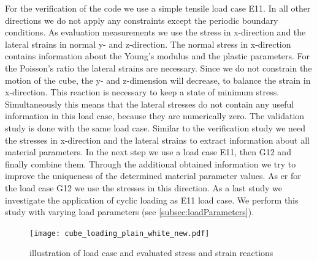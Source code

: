     For the verification of the code we use a simple tensile load case E11.
    In all other directions we do not apply any constraints except the periodic boundary conditions. As evaluation measurements we use the stress in x-direction and the lateral strains in normal y- and z-direction. The normal stress in x-direction contains information about the Young's modulus and the plastic parameters. For the Poisson's ratio the lateral strains are necessary. Since we do not constrain the motion of the cube, the y- and z-dimension will decrease, to balance the strain in x-direction. This reaction is necessary to keep a state of minimum stress. Simultaneously this means that the lateral stresses do not contain any useful information in this load case, because they are numerically zero. 
    The validation study is done with the same load case. Similar to the verification study we need the stresses in x-direction and the lateral strains to extract information about all material parameters. 
    In the next step we use a load case E11, then G12 and finally combine them. Through the additional obtained information we try to improve the uniqueness of the determined material parameter values. As \acrlong{er} for the load case G12 we use the stresses in this direction.
    As a last study we investigate the application of cyclic loading as E11 load case. We perform this study with varying load parameters (see \autoref{subsec:loadParameters}). 


    \begin{figure}[H]
		\centering
        \texttt{[image: cube\_loading\_plain\_white\_new.pdf]}
		\caption{illustration of load case and evaluated stress and strain reactions}
		\label{fig:evaluationMeasurements}
	\end{figure}

